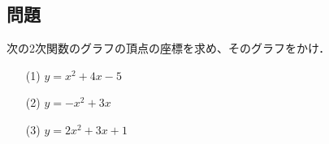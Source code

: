 \documentclass[8pt,dvipdfmx]{article}
\begin{document}
\begin{tcolorbox}[title=数学\textcircled{1} 1-1 A]
\section*{問題}
次の2次関数のグラフの頂点の座標を求め、そのグラフをかけ．

\begin{enumerate}
    \item[(1)] \( y = x^2 + 4x - 5 \)

    \vspace{2mm} %

    \item[(2)] \( y = -x^2 + 3x \)

    \vspace{2mm} %

    \item[(3)] \( y = 2x^2 + 3x +1 \)
\end{enumerate}
\end{tcolorbox}

\end{document}
